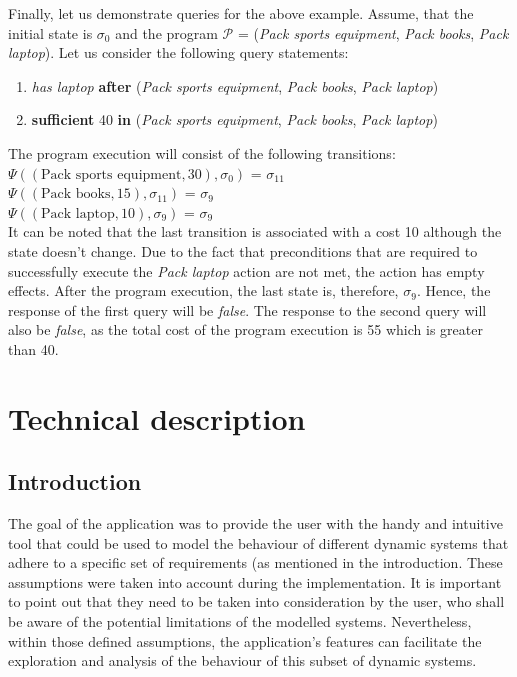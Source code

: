 \documentclass[a4paper]{article}
\begin{document}
Finally, let us demonstrate queries for the above example. Assume, that the initial state is $\sigma_0$ and the program $\mathcal{P}$ = (\textit{Pack sports equipment}, \textit{Pack books}, \textit{Pack laptop}). Let us consider the following query statements:
\begin{enumerate}
    \item \textit{has laptop} \textbf{after} (\textit{Pack sports equipment}, \textit{Pack books}, \textit{Pack laptop})
    \item \textbf{sufficient} 40 \textbf{in} (\textit{Pack sports equipment}, \textit{Pack books}, \textit{Pack laptop})
\end{enumerate}
The program execution will consist of the following transitions: \\[0.5\baselineskip]
$\Psi((\text{Pack sports equipment},30),\sigma_0)$ = $\sigma_{11}$ \\[0.1\baselineskip]
$\Psi((\text{Pack books},15),\sigma_{11})$ = $\sigma_9$ \\[0.1\baselineskip]
$\Psi((\text{Pack laptop},10),\sigma_9)$ = $\sigma_9$ \\[0.5\baselineskip]
It can be noted that the last transition is associated with a cost 10 although the state doesn't change. Due to the fact that preconditions that are required to successfully execute the \emph{Pack laptop} action are not met, the action has empty effects. After the program execution, the last state is, therefore, $\sigma_9$. Hence, the response of the first query will be \textit{false}. The response to the second query will also be \textit{false}, as the total cost of the program execution is 55 which is greater than 40.

\section{Technical description}
\subsection{Introduction}
%
The goal of the application was to provide the user with the handy and intuitive tool that could be used to model the behaviour of different dynamic systems that adhere to a specific set of requirements (as mentioned in the introduction. These assumptions were taken into account during the implementation. It is important to point out that they need to be taken into consideration by the user, who shall be aware of the potential limitations of the modelled systems. Nevertheless, within those defined assumptions, the application's features can facilitate the exploration and analysis of the behaviour of this subset of dynamic systems. 
\end{document}
